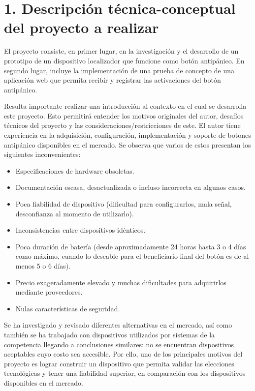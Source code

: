 \documentclass[
11pt, %
]{charter}
\begin{document}
\section{1. Descripción técnica-conceptual del proyecto a realizar}
\label{sec:descripcion}


El proyecto consiste, en primer lugar, en la investigación y el desarrollo de un prototipo de un dispositivo localizador que funcione como botón antipánico. En segundo lugar, incluye la implementación de una prueba de concepto de una aplicación web que permita recibir y registrar las activaciones del botón antipánico.

Resulta importante realizar una introducción al contexto en el cual se desarrolla este proyecto. Esto permitirá entender los motivos originales del autor, desafíos técnicos del proyecto y las consideraciones/restricciones de este.
El autor tiene experiencia en la adquisición, configuración, implementación y soporte de botones antipánico disponibles en el mercado. Se observa que varios de estos presentan los siguientes inconvenientes:
\begin{itemize}
	\item Especificaciones de hardware obsoletas.
	\item Documentación escasa, desactualizada o incluso incorrecta en algunos casos.
	\item Poca fiabilidad de dispositivo (dificultad para configurarlos, mala señal, desconfianza al momento de utilizarlo).
	\item Inconsistencias entre dispositivos idénticos.
	\item Poca duración de batería (desde aproximadamente 24 horas hasta 3 o 4 días como máximo, cuando lo deseable para el beneficiario final del botón es de al menos 5 o 6 días).
	\item Precio exageradamente elevado y muchas dificultades para adquirirlos mediante proveedores.
	\item Nulas características de seguridad.
\end{itemize}

Se ha investigado y revisado diferentes alternativas en el mercado, así como también se ha trabajado con dispositivos utilizados por sistemas de la competencia llegando a conclusiones similares: no se encuentran dispositivos aceptables cuyo costo sea accesible. 
Por ello, uno de los principales motivos del proyecto es lograr construir un dispositivo que permita validar las elecciones tecnológicas y tener una fiabilidad superior, en comparación con los dispositivos disponibles en el mercado.
\end{document}
